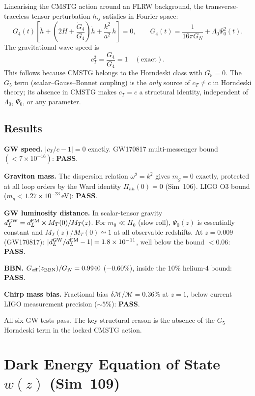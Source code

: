 \documentclass[12pt,a4paper]{article}
\begin{document}
Linearising the CMSTG action around an FLRW background, the transverse-traceless
tensor perturbation $h_{ij}$ satisfies in Fourier space:
\begin{equation}
  G_4(t)\left[\ddot{h} + \left(2H + \frac{\dot{G}_4}{G_4}\right)\dot{h}
  + \frac{k^2}{a^2}\,h\right] = 0,
  \qquad
  G_4(t) = \frac{1}{16\pi G_N} + \Lambda_0\Psi_0^2(t).
\end{equation}
The gravitational wave speed is
\begin{equation}
  c_T^2 = \frac{G_4}{G_4} = 1 \quad (\text{exact}).
\end{equation}
This follows because CMSTG belongs to the Horndeski class with $G_5=0$.
The $G_5$ term (scalar--Gauss--Bonnet coupling) is the \emph{only}
source of $c_T\ne c$ in Horndeski theory; its absence in CMSTG makes
$c_T=c$ a structural identity, independent of $\Lambda_0$, $\Psi_0$,
or any parameter.

\subsection{Results}

\textbf{GW speed.} $|c_T/c - 1| = 0$ exactly.
GW170817 multi-messenger bound $(<7\times10^{-16})$: \textbf{PASS}.

\textbf{Graviton mass.} The dispersion relation $\omega^2=k^2$ gives $m_g=0$
exactly, protected at all loop orders by the Ward identity
$\Pi_{hh}(0)=0$ (Sim~106).  LIGO O3 bound ($m_g<1.27\times10^{-23}$\,eV):
\textbf{PASS}.

\textbf{GW luminosity distance.}
In scalar-tensor gravity $d_L^{\rm GW} = d_L^{\rm EM}\times M_T(0)/M_T(z)$.
For $m_0\ll H_0$ (slow roll), $\Psi_0(z)$ is essentially constant and
$M_T(z)/M_T(0)\simeq1$ at all observable redshifts.
At $z=0.009$ (GW170817): $|d_L^{\rm GW}/d_L^{\rm EM}-1|=1.8\times10^{-11}$,
well below the bound $<0.06$: \textbf{PASS}.

\textbf{BBN.} $G_{\rm eff}(z_{\rm BBN})/G_N = 0.9940$ ($-0.60\%$),
inside the 10\% helium-4 bound: \textbf{PASS}.

\textbf{Chirp mass bias.} Fractional bias $\delta\mathcal{M}/\mathcal{M}=0.36\%$
at $z=1$, below current LIGO measurement precision ($\sim5\%$): \textbf{PASS}.

All six GW tests pass.  The key structural reason is the absence of the $G_5$
Horndeski term in the locked CMSTG action.

\section{Dark Energy Equation of State $w(z)$ (Sim~109)}
\label{sec:sim109}
\end{document}
